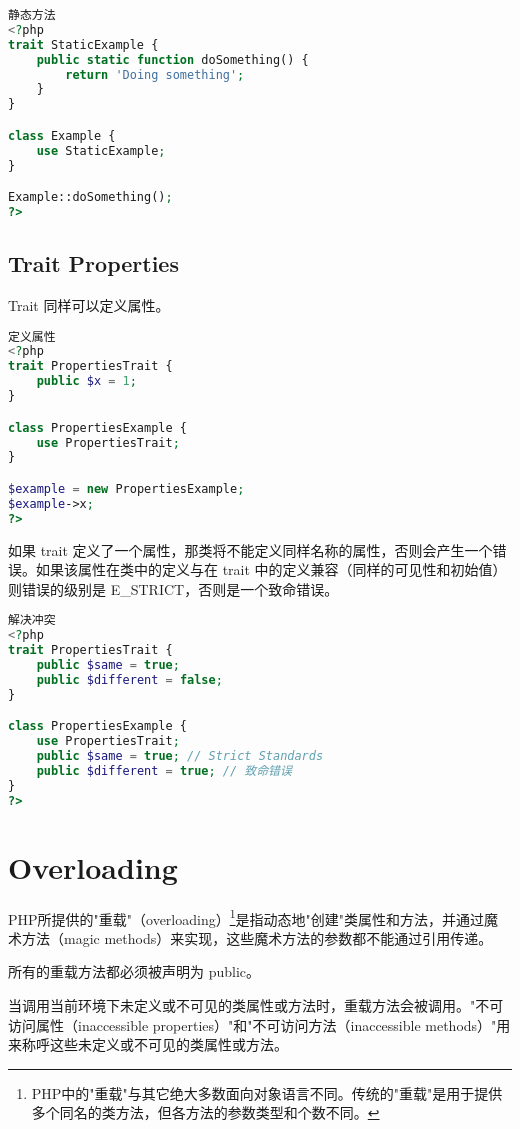 \begin{lstlisting}[language=PHP]
静态方法
<?php
trait StaticExample {
    public static function doSomething() {
        return 'Doing something';
    }
}

class Example {
    use StaticExample;
}

Example::doSomething();
?>
\end{lstlisting}





\section{Trait Properties}

Trait 同样可以定义属性。

\begin{lstlisting}[language=PHP]
定义属性
<?php
trait PropertiesTrait {
    public $x = 1;
}

class PropertiesExample {
    use PropertiesTrait;
}

$example = new PropertiesExample;
$example->x;
?>
\end{lstlisting}

如果 trait 定义了一个属性，那类将不能定义同样名称的属性，否则会产生一个错误。如果该属性在类中的定义与在 trait 中的定义兼容（同样的可见性和初始值）则错误的级别是 E\_STRICT，否则是一个致命错误。

\begin{lstlisting}[language=PHP]
解决冲突
<?php
trait PropertiesTrait {
    public $same = true;
    public $different = false;
}

class PropertiesExample {
    use PropertiesTrait;
    public $same = true; // Strict Standards
    public $different = true; // 致命错误
}
?>
\end{lstlisting}

\chapter{Overloading}



PHP所提供的"重载"（overloading）\footnote{PHP中的"重载"与其它绝大多数面向对象语言不同。传统的"重载"是用于提供多个同名的类方法，但各方法的参数类型和个数不同。}是指动态地"创建"类属性和方法，并通过魔术方法（magic methods）来实现，这些魔术方法的参数都不能通过引用传递。

所有的重载方法都必须被声明为 public。

当调用当前环境下未定义或不可见的类属性或方法时，重载方法会被调用。"不可访问属性（inaccessible properties）"和"不可访问方法（inaccessible methods）"用来称呼这些未定义或不可见的类属性或方法。


